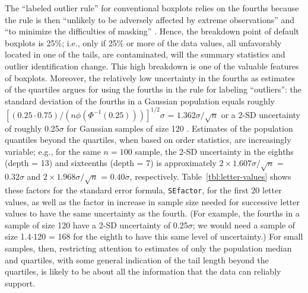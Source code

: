 \documentclass[oneside]{article}
\begin{document}
The ``labeled outlier rule'' for conventional boxplots relies on the fourths because the rule is then ``unlikely to be adversely affected by extreme observations'' and ``to minimize the difficulties of masking'' \citep[pg. 992]{dchbox}. Hence, the breakdown point of default boxplots is 25\%; i.e., only if 25\% or more of the data values, all unfavorably located in one of the tails, are contaminated, will the summary statistics and outlier identification change. This high breakdown is one of the valuable features of boxplots. Moreover, the relatively low uncertainty in the fourths as estimates of the quartiles argues for using the fourths in the rule for labeling ``outliers'': the standard deviation of the fourths in a Gaussian population equals roughly $[(0.25 \cdot 0.75) / (n \phi(\Phi^{-1}(0.25)))]^{1/2} \sigma$ = $1.362 \sigma / \sqrt{n}$ or a 2-SD uncertainty of roughly 0.25$\sigma$ for Gaussian samples of size 120 \citep{ha.order}. Estimates of the population quantiles beyond the quartiles, when based on order statistics, are increasingly variable; e.g., for the same $n = 100$ sample, the 2-SD uncertainty in the eighths (depth = 13) and sixteenths (depth = 7) is approximately $ 2 \times 1.607 \sigma / \sqrt{n}$ = $0.32 \sigma$ and $ 2 \times 1.968 \sigma / \sqrt{n}$ = $0.40 \sigma$, respectively. Table~\ref{tbl:letter-values} shows these factors for the standard error formula, \texttt{SEfactor}, for the first 20 letter values, as well as the factor in increase in sample size needed for successive letter values to have the same uncertainty as the fourth. (For example, the fourths in a sample of size 120 have a 2-SD uncertainty of 0.25$\sigma$; we would need a sample of size 1.4$\cdot$120 = 168 for the eighth to have this same level of uncertainty.) For small samples, then, restricting attention to estimates of only the population median and quartiles, with some general indication of the tail length beyond the quartiles, is likely to be about all the information that the data can reliably support.
\end{document}
